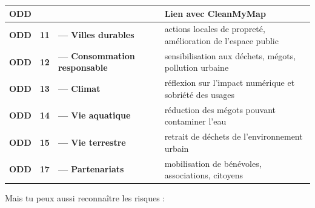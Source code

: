 \documentclass[
  10pt,
  a4paper,
  DIV=11,
  numbers=noendperiod,
  oneside]{scrreprt}
\newcounter{none} %
\let\oldtextbf\textbf
\renewcommand{\textbf}[1]{\oldtextbf{\textcolor{cmmnavy}{#1}}}
\begin{document}
{\def\LTcaptype{none} %
\begin{longtable}[]{@{}
  >{\raggedright\arraybackslash}p{}
  >{\raggedright\arraybackslash}p{}
  >{\raggedright\arraybackslash}p{}
  >{\raggedright\arraybackslash}p{}@{}}
\toprule\noalign{}
\begin{minipage}[b]{\linewidth}\raggedright
ODD
\end{minipage} & \begin{minipage}[b]{\linewidth}\raggedright
\end{minipage} & \begin{minipage}[b]{\linewidth}\raggedright
\end{minipage} & \begin{minipage}[b]{\linewidth}\raggedright
Lien avec CleanMyMap
\end{minipage} \\
\midrule\noalign{}
\endhead
\bottomrule\noalign{}
\endlastfoot
\textbf{ODD} & \textbf{11} & \textbf{--- Villes durables} & actions
locales de propreté, amélioration de l'espace public \\
\textbf{ODD} & \textbf{12} & \textbf{--- Consommation responsable} &
sensibilisation aux déchets, mégots, pollution urbaine \\
\textbf{ODD} & \textbf{13} & \textbf{--- Climat} & réflexion sur
l'impact numérique et sobriété des usages \\
\textbf{ODD} & \textbf{14} & \textbf{--- Vie aquatique} & réduction des
mégots pouvant contaminer l'eau \\
\textbf{ODD} & \textbf{15} & \textbf{--- Vie terrestre} & retrait de
déchets de l'environnement urbain \\
\textbf{ODD} & \textbf{17} & \textbf{--- Partenariats} & mobilisation de
bénévoles, associations, citoyens \\
\end{longtable}
}

Mais tu peux aussi reconnaître les risques :
\end{document}
